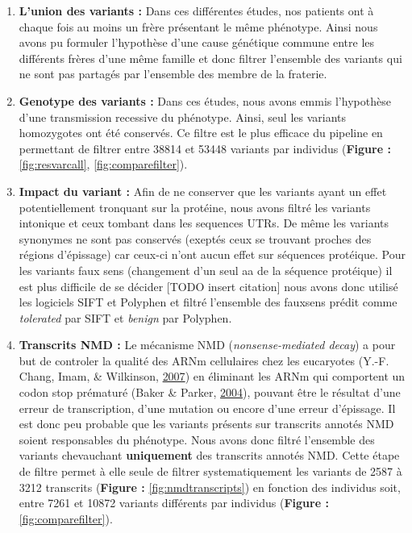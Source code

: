 \documentclass[12pt,twoside]{reedthesis}
\providecommand{\tightlist}{%
  \setlength{\itemsep}{0pt}\setlength{\parskip}{0pt}}
\theoremstyle{definition}
\theoremstyle{definition}
\theoremstyle{remark}
\begin{document}
  \begin{enumerate}
  \def\labelenumi{\arabic{enumi}.}
  \tightlist
  \item
    \textbf{L'union des variants :} Dans ces différentes études, nos
    patients ont à chaque fois au moins un frère présentant le même
    phénotype. Ainsi nous avons pu formuler l'hypothèse d'une cause
    génétique commune entre les différents frères d'une même famille et
    donc filtrer l'ensemble des variants qui ne sont pas partagés par
    l'ensemble des membre de la fraterie.\\
  \item
    \textbf{Genotype des variants :} Dans ces études, nous avons emmis
    l'hypothèse d'une transmission recessive du phénotype. Ainsi, seul les
    variants homozygotes ont été conservés. Ce filtre est le plus efficace
    du pipeline en permettant de filtrer entre 38814 et 53448 variants par
    individus (\textbf{Figure : }\ref{fig:resvarcall},
    \ref{fig:comparefilter}).\\
  \item
    \textbf{Impact du variant :} Afin de ne conserver que les variants
    ayant un effet potentiellement tronquant sur la protéine, nous avons
    filtré les variants intonique et ceux tombant dans les sequences UTRs.
    De même les variants synonymes ne sont pas conservés (exeptés ceux se
    trouvant proches des régions d'épissage) car ceux-ci n'ont aucun effet
    sur séquences protéique. Pour les variants faux sens (changement d'un
    seul aa de la séquence protéique) il est plus difficile de se décider
    {[}TODO insert citation{]} nous avons donc utilisé les logiciels SIFT
    et Polyphen et filtré l'ensemble des fauxsens prédit comme
    \emph{tolerated} par SIFT et \emph{benign} par Polyphen.\\
  \item
    \textbf{Transcrits NMD :} Le mécanisme NMD (\emph{nonsense-mediated
    decay}) a pour but de controler la qualité des ARNm cellulaires chez
    les eucaryotes (Y.-F. Chang, Imam, \& Wilkinson,
    \protect\hyperlink{ref-Chang2007}{2007}) en éliminant les ARNm qui
    comportent un codon stop prématuré (Baker \& Parker,
    \protect\hyperlink{ref-Baker2004}{2004}), pouvant être le résultat
    d'une erreur de transcription, d'une mutation ou encore d'une erreur
    d'épissage. Il est donc peu probable que les variants présents sur
    transcrits annotés NMD soient responsables du phénotype. Nous avons
    donc filtré l'ensemble des variants chevauchant \textbf{uniquement}
    des transcrits annotés NMD. Cette étape de filtre permet à elle seule
    de filtrer systematiquement les variants de 2587 à 3212 transcrits
    (\textbf{Figure : }\ref{fig:nmdtranscripts}) en fonction des individus
    soit, entre 7261 et 10872 variants différents par individus
    (\textbf{Figure : }\ref{fig:comparefilter}).
  \end{enumerate}
  
\end{document}
